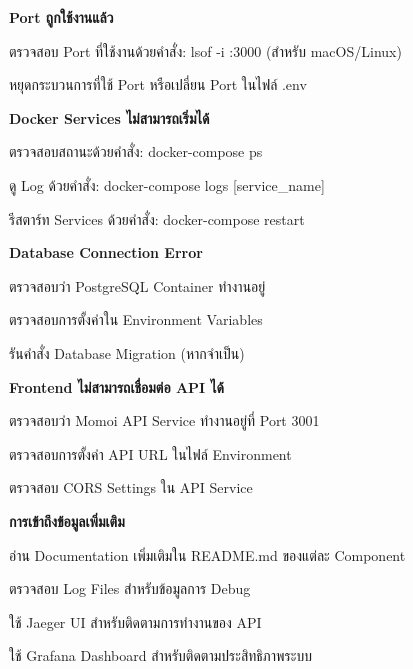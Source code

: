 \begin{mycustomenum2}
    \item \textbf{Port ถูกใช้งานแล้ว}
    \begin{mycustomenum2}
        \item ตรวจสอบ Port ที่ใช้งานด้วยคำสั่ง: lsof -i :3000 (สำหรับ macOS/Linux)
        \item หยุดกระบวนการที่ใช้ Port หรือเปลี่ยน Port ในไฟล์ .env
    \end{mycustomenum2}

    \item \textbf{Docker Services ไม่สามารถเริ่มได้}
    \begin{mycustomenum2}
        \item ตรวจสอบสถานะด้วยคำสั่ง: docker-compose ps
        \item ดู Log ด้วยคำสั่ง: docker-compose logs [service\_name]
        \item รีสตาร์ท Services ด้วยคำสั่ง: docker-compose restart
    \end{mycustomenum2}

    \item \textbf{Database Connection Error}
    \begin{mycustomenum2}
        \item ตรวจสอบว่า PostgreSQL Container ทำงานอยู่
        \item ตรวจสอบการตั้งค่าใน Environment Variables
        \item รันคำสั่ง Database Migration (หากจำเป็น)
    \end{mycustomenum2}

    \item \textbf{Frontend ไม่สามารถเชื่อมต่อ API ได้}
    \begin{mycustomenum2}
        \item ตรวจสอบว่า Momoi API Service ทำงานอยู่ที่ Port 3001
        \item ตรวจสอบการตั้งค่า API URL ในไฟล์ Environment
        \item ตรวจสอบ CORS Settings ใน API Service
    \end{mycustomenum2}
\end{mycustomenum2}

\newpage
\vspace{0.5em}
\textbf{การเข้าถึงข้อมูลเพิ่มเติม}
\vspace{0.5em}

\begin{mycustomenum2}
    \item อ่าน Documentation เพิ่มเติมใน README.md ของแต่ละ Component
    \item ตรวจสอบ Log Files สำหรับข้อมูลการ Debug
    \item ใช้ Jaeger UI สำหรับติดตามการทำงานของ API
    \item ใช้ Grafana Dashboard สำหรับติดตามประสิทธิภาพระบบ
\end{mycustomenum2}
